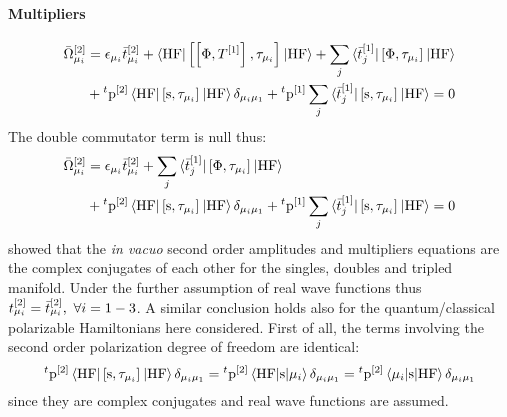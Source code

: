 \paragraph*{Multipliers}
\begin{equation}
  \begin{aligned}
  \bar{\Omega}_{\mu_i}^{[2]} &=
    \epsilon_{\mu_i}\bar{t}_{\mu_i}^{[2]}
    + \braket{\mathrm{HF} | \left[ \left[ \Phi, T^{[1]} \right]^{}, \tau_{\mu_i} \right]^{} | \mathrm{HF}}
    + \sum_j\braket{\bar{t}_{j}^{[1]} |
    \left[ \Phi, \tau_{\mu_i} \right]^{} | \mathrm{HF}} \\
    &+ {}^t\mathrm{p}^{[2]}\braket{\mathrm{HF} |
    \left[ \mathrm{s}, \tau_{\mu_i} \right]^{} | \mathrm{HF}}\delta_{\mu_i\mu_1}
    + {}^t\mathrm{p}^{[1]}
    \sum_j\braket{\bar{t}_{j}^{[1]} |
    \left[ \mathrm{s}, \tau_{\mu_i} \right]^{} | \mathrm{HF}}
    =0
  \end{aligned}
\end{equation}
The double commutator term is null thus:~\autocite{Koch1997-nm, Helgaker2000-tz}
\begin{equation}\label{eq:2nd-order-mult}
  \begin{aligned}
  \bar{\Omega}_{\mu_i}^{[2]} &=
    \epsilon_{\mu_i}\bar{t}_{\mu_i}^{[2]}
    + \sum_j\braket{\bar{t}_{j}^{[1]} |
    \left[ \Phi, \tau_{\mu_i} \right]^{} | \mathrm{HF}} \\
    &+ {}^t\mathrm{p}^{[2]}\braket{\mathrm{HF} |
    \left[ \mathrm{s}, \tau_{\mu_i} \right]^{} | \mathrm{HF}}\delta_{\mu_i\mu_1}
    + {}^t\mathrm{p}^{[1]}
    \sum_j\braket{\bar{t}_{j}^{[1]} |
    \left[ \mathrm{s}, \tau_{\mu_i} \right]^{} | \mathrm{HF}}
    =0
  \end{aligned}
\end{equation}
\citeauthor{Koch1997-nm} showed that the \emph{in vacuo} second order
amplitudes and multipliers equations are the complex conjugates of each
other for the singles, doubles and tripled manifold. Under the further
assumption of real wave functions thus $t_{\mu_i}^{[2]} =
\bar{t}_{\mu_i}^{[2]},\,\,\forall i = 1 - 3$.
A similar conclusion holds also for the quantum/classical polarizable
Hamiltonians here considered.
First of all, the terms involving the second order polarization degree of
freedom are identical:
\begin{equation}
    {}^t\mathrm{p}^{[2]}\braket{\mathrm{HF} | \left[ \mathrm{s}, \tau_{\mu_i} \right]^{} | \mathrm{HF}}\delta_{\mu_i\mu_1}
    =
    {}^t\mathrm{p}^{[2]}\braket{\mathrm{HF} | \mathrm{s}|\mu_i}\delta_{\mu_i\mu_1}
    =
    {}^t\mathrm{p}^{[2]}\braket{\mu_i| \mathrm{s}|\mathrm{HF}}\delta_{\mu_i\mu_1}
\end{equation}
since they are complex conjugates and real wave functions are assumed.
